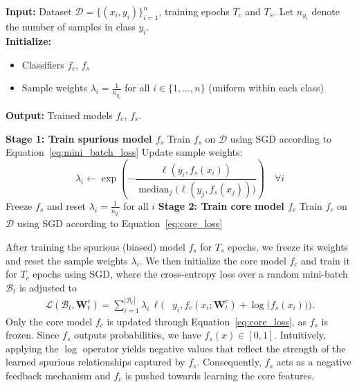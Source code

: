 \documentclass[letter,11pt]{article}
\begin{document}
\begin{algorithm}[t]
\caption{Two-Stage Model Training}
\label{alg:two_stage}
\textbf{Input:} Dataset $\mathcal{D} = \{(x_i, y_i)\}_{i=1}^n$, training epochs $T_c$ and $T_s$. Let $n_{y_i}$ denote the number of samples in class $y_i$.\\
\textbf{Initialize:} 
\begin{itemize}
    \item Classifiers $f_c$, $f_s$
    \item Sample weights $\lambda_i = \frac{1}{n_{y_i}}$ for all $i \in \{1, \ldots, n\}$ (uniform within each class)
\end{itemize}
\textbf{Output:} Trained models $f_c$, $f_s$.
\begin{algorithmic}[1]
\State \textbf{Stage 1: Train spurious model $f_s$}
        \State Train $f_s$ on $\mathcal{D}$ using SGD according to Equation~\eqref{eq:mini_batch_loss}
        \State Update sample weights:
        \[
        \lambda_i \gets \exp\!\left(- \frac{\ell(y_i, f_s(x_i))}{\operatorname{median}_j\big(\ell(y_j, f_s(x_j))\big)}\right) \quad \forall i
        \]
    \EndFor
    \State Freeze $f_s$ and reset $\lambda_i = \frac{1}{n_{y_i}}$ for all $i$
\Statex
\State \textbf{Stage 2: Train core model $f_c$}
        \State Train $f_c$ on $\mathcal{D}$ using SGD according to Equation~\eqref{eq:core_loss}
    \EndFor
\end{algorithmic}
\end{algorithm}

After training the spurious (biased) model $f_s$ for $T_s$ epochs, we freeze its weights and reset the sample weights $\lambda_i$. We then initialize the core model $f_c$ and train it for $T_c$ epochs using SGD, where the cross-entropy loss over a random mini-batch $\mathcal{B}_t$ is adjusted to
\begin{align}
    \mathcal{L}(\mathcal{B}_t, \mathbf{W}_{t}^c) 
    = \sum_{i=1}^{|\mathcal{B}_t|} \lambda_i \, \ell\bigg( 
    &y_i, f_c(x_i;\mathbf{W}_{t}^c) + \log\!\big(f_s(x_i)\big)\bigg).
    \label{eq:core_loss}
\end{align}
Only the core model $f_c$ is updated through Equation~\eqref{eq:core_loss}, as $f_s$ is frozen. Since $f_s$ outputs probabilities,  we have $f_s(x) \in [0,1]$. Intuitively, applying the $\log$ operator yields negative values that reflect the strength of the learned spurious relationships captured by $f_s$. Consequently, $f_s$ acts as a negative feedback mechanism and $f_c$ is pushed towards learning the core features.
\end{document}
